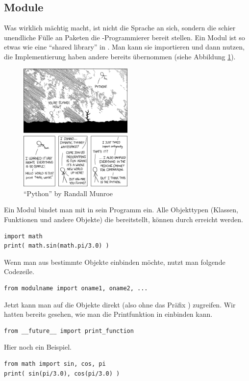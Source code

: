 \subsection{Module}
\label{section:crashkurs:module}
Was \Python wirklich mächtig macht, ist nicht die Sprache an sich, sondern die schier unendliche Fülle an Paketen die \Python-Programmierer bereit stellen.
Ein Modul ist so etwas wie eine ``shared library'' in \CC.
Man kann sie importieren und dann nutzen, die Implementierung haben andere bereits übernommen (siehe Abbildung \ref{figure:xkcd_python}).
\begin{figure}[ht]
  \centering
  \includegraphics[width=0.5\textwidth]{pictures/xkcd_python.png}
  \caption{\label{figure:xkcd_python}``Python'' by Randall Munroe \cite{Munroe_python}}
\end{figure}

Ein Modul bindet man mit  in sein Programm ein.
Alle Objekttypen (Klassen, Funktionen und andere Objekte) die  bereitstellt, können durch  erreicht werden.
\begin{lstlisting}
import math
print( math.sin(math.pi/3.0) )
\end{lstlisting}
Wenn man aus  bestimmte Objekte einbinden möchte, nutzt man folgende Codezeile.
\begin{lstlisting}
from modulname import oname1, oname2, ...
\end{lstlisting}
Jetzt kann man auf die Objekte direkt (also ohne das Präfix ) zugreifen.
Wir hatten bereits gesehen, wie man die \PythonDrei Printfunktion in \PythonZwei einbinden kann.
\begin{lstlisting}
from __future__ import print_function
\end{lstlisting}
Hier noch ein Beispiel.
\begin{lstlisting}
from math import sin, cos, pi
print( sin(pi/3.0), cos(pi/3.0) )
\end{lstlisting}

